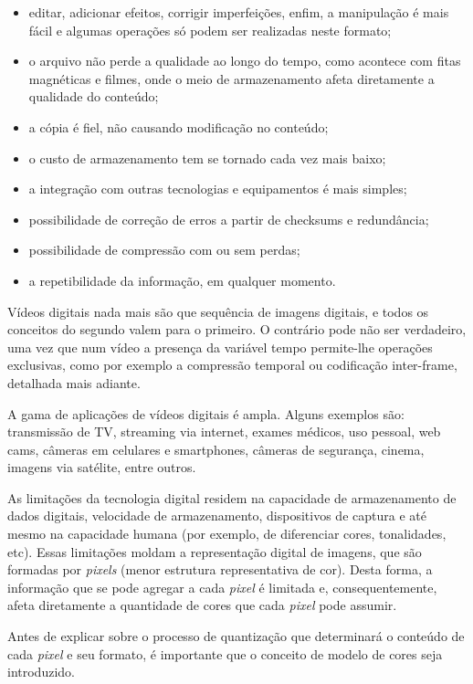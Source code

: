 \begin{itemize}
	\item editar, adicionar efeitos, corrigir imperfeições, enfim, a manipulação é mais fácil e algumas operações só podem ser realizadas neste formato;
	\item o arquivo não perde a qualidade ao longo do tempo, como acontece com fitas magnéticas e filmes, onde o meio de armazenamento afeta diretamente a qualidade do conteúdo;
	\item a cópia é fiel, não causando modificação no conteúdo;
	\item o custo de armazenamento tem se tornado cada vez mais baixo;
	\item a integração com outras tecnologias e equipamentos é mais simples;
	\item possibilidade de correção de erros a partir de checksums e redundância;
	\item possibilidade de compressão com ou sem perdas;
	\item a repetibilidade da informação, em qualquer momento.
\end{itemize}

Vídeos digitais nada mais são que sequência de imagens digitais, e todos os conceitos do segundo valem para o primeiro. O contrário pode não ser verdadeiro, uma vez que num vídeo a presença da variável tempo permite-lhe operações exclusivas, como por exemplo a compressão temporal ou codificação inter-frame, detalhada mais adiante.

A gama de aplicações de vídeos digitais é ampla. Alguns exemplos são: transmissão de TV, streaming via internet, exames médicos, uso pessoal, web cams, câmeras em celulares e smartphones, câmeras de segurança, cinema, imagens via satélite, entre outros.

As limitações da tecnologia digital residem na capacidade de armazenamento de dados digitais, velocidade de armazenamento, dispositivos de captura e até mesmo na capacidade humana (por exemplo, de diferenciar cores, tonalidades, etc). Essas limitações moldam a representação digital de imagens, que são formadas por \emph{pixels} (menor estrutura representativa de cor). Desta forma, a informação que se pode agregar a cada \emph{pixel} é limitada e, consequentemente, afeta diretamente a quantidade de cores que cada \emph{pixel} pode assumir.

Antes de explicar sobre o processo de quantização que determinará o conteúdo de cada \emph{pixel} e seu formato, é importante que o conceito de modelo de cores seja introduzido.


